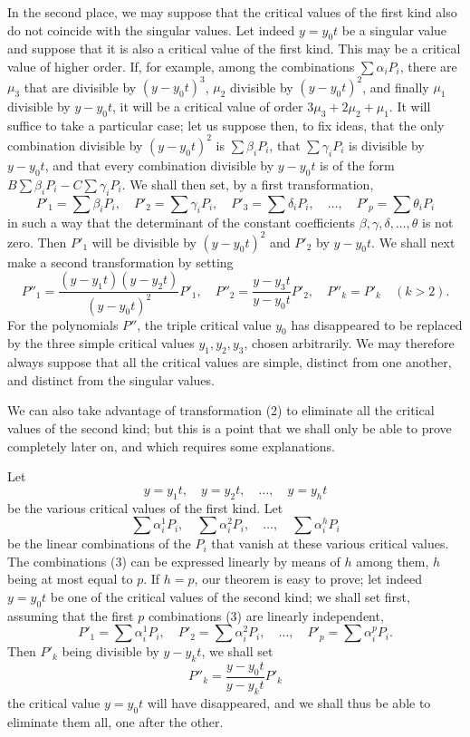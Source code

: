 \documentclass{article}
\begin{document}
In the second place, we may suppose that the critical values of the first kind also do not coincide with the singular values. Let indeed $y = y_{0} t$ be a singular value and suppose that it is also a critical value of the first kind. This may be a critical value of higher order. If, for example, among the combinations $\displaystyle\sum \alpha_{i} P_{i}$, there are $\mu_{3}$ that are divisible by $(y - y_{0} t)^{3}$, $\mu_{2}$ divisible by $(y - y_{0} t)^{2}$, and finally $\mu_{1}$ divisible by $y - y_{0} t$, it will be a critical value of order $3\mu_{3} + 2\mu_{2} + \mu_{1}$. It will suffice to take a particular case; let us suppose then, to fix ideas, that the only combination divisible by $(y - y_{0} t)^{2}$ is $\displaystyle\sum \beta_{i} P_{i}$, that $\displaystyle\sum \gamma_{i} P_{i}$ is divisible by $y - y_{0} t$, and that every combination divisible by $y - y_{0} t$ is of the form $B\displaystyle\sum \beta_{i} P_{i} - C\displaystyle\sum \gamma_{i} P_{i}$. We shall then set, by a first transformation,
\[
P'_{1} = \sum \beta_{i} P_{i}, \quad P'_{2} = \sum \gamma_{i} P_{i}, \quad P'_{3} = \sum \delta_{i} P_{i}, \quad \ldots, \quad P'_{p} = \sum \theta_{i} P_{i}
\]
in such a way that the determinant of the constant coefficients $\beta, \gamma, \delta, \ldots, \theta$ is not
zero. Then $P'_{1}$ will be divisible by $(y - y_{0} t)^{2}$ and $P'_{2}$ by $y - y_{0} t$. We shall next make a second transformation by setting
\[
P''_{1} = \frac{(y - y_{1} t)(y - y_{2} t)}{(y - y_{0} t)^{2}} P'_{1}, \quad P''_{2} = \frac{y - y_{3} t}{y - y_{0} t} P'_{2}, \quad P''_{k} = P'_{k} \quad (k > 2).
\]
For the polynomials $P''$, the triple critical value $y_{0}$ has disappeared to be replaced by the three simple critical values $y_{1}, y_{2}, y_{3}$, chosen arbitrarily. We may therefore always suppose that all the critical values are simple, distinct from one another, and distinct from the singular values.

We can also take advantage of transformation (2) to eliminate all the critical values of the second kind; but this is a point that we shall only be able to prove completely later on, and which requires some explanations.

Let
\[
y = y_{1} t, \quad y = y_{2} t, \quad \ldots, \quad y = y_{h} t
\]
be the various critical values of the first kind. Let
\[
\sum \alpha_{i}^{1} P_{i}, \quad \sum \alpha_{i}^{2} P_{i}, \quad \ldots, \quad \sum \alpha_{i}^{h} P_{i} \tag{3}
\]
be the linear combinations of the $P_{i}$ that vanish at these various critical values. The combinations (3) can be expressed linearly by means of $h$ among them, $h$ being at most equal to $p$. If $h = p$, our theorem is easy to prove; let indeed $y = y_{0} t$ be one of the critical values of the second kind; we shall set first, assuming that the first $p$ combinations (3) are linearly independent,
\[
P'_{1} = \sum \alpha_{i}^{1} P_{i}, \quad P'_{2} = \sum \alpha_{i}^{2} P_{i}, \quad \ldots, \quad P'_{p} = \sum \alpha_{i}^{p} P_{i}.
\]
Then $P'_{k}$ being divisible by $y - y_{k} t$, we shall set
\[
P''_{k} = \frac{y - y_{0} t}{y - y_{k} t} P'_{k}
\]
the critical value $y = y_{0} t$ will have disappeared, and we shall thus be able to eliminate them all, one after the other.
\end{document}
